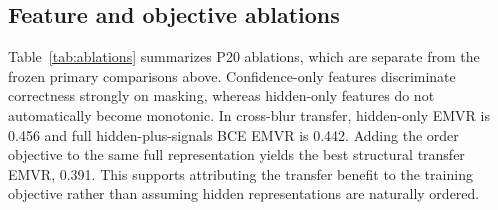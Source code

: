 \subsection{Feature and objective ablations}

Table~\ref{tab:ablations} summarizes P20 ablations, which are separate from the frozen primary comparisons above. Confidence-only features discriminate correctness strongly on masking, whereas hidden-only features do not automatically become monotonic. In cross-blur transfer, hidden-only EMVR is 0.456 and full hidden-plus-signals BCE EMVR is 0.442. Adding the order objective to the same full representation yields the best structural transfer EMVR, 0.391. This supports attributing the transfer benefit to the training objective rather than assuming hidden representations are naturally ordered.


